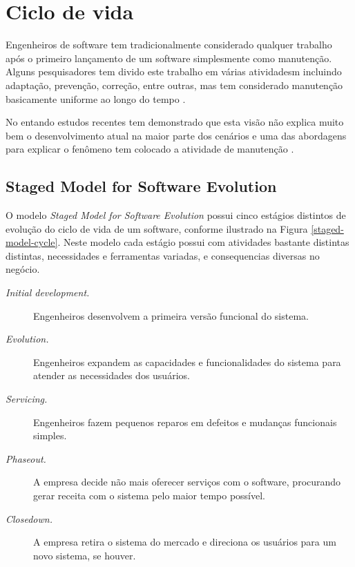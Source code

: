 \section{Ciclo de vida}

Engenheiros de software tem tradicionalmente considerado qualquer trabalho após
o primeiro lançamento de um software simplesmente como manutenção. Alguns
pesquisadores tem divido este trabalho em várias atividadesm incluindo
adaptação, prevenção, correção, entre outras, mas tem considerado manutenção
basicamente uniforme ao longo do tempo \cite{rajlich2000staged}.

No entando estudos recentes tem demonstrado que esta visão não explica muito
bem o desenvolvimento atual na maior parte dos cenários e uma das abordagens
para explicar o fenômeno tem colocado a atividade de manutenção \cite{rajlich2000staged}.

\subsection{Staged Model for Software Evolution}

O modelo {\it Staged Model for Software Evolution} \cite{rajlich2000staged}
possui cinco estágios distintos de evolução do ciclo de vida de um software,
conforme ilustrado na Figura \ref{staged-model-cycle}.  Neste modelo cada
estágio possui com atividades bastante distintas distintas, necessidades e
ferramentas variadas, e consequencias diversas no negócio.

\begin{description}
  \item [{\it Initial development.}]
    Engenheiros desenvolvem a primeira versão funcional do sistema.
  \item [{\it Evolution.}]
    Engenheiros expandem as capacidades e funcionalidades do sistema para
    atender as necessidades dos usuários.
  \item [{\it Servicing.}]
    Engenheiros fazem pequenos reparos em defeitos e mudanças funcionais
    simples.
  \item [{\it Phaseout.}]
    A empresa decide não mais oferecer serviços com o software, procurando
    gerar receita com o sistema pelo maior tempo possível.
  \item [{\it Closedown.}]
    A empresa retira o sistema do mercado e direciona os usuários para um novo
    sistema, se houver.
\end{description}


